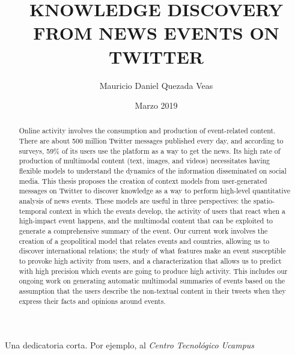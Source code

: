 \documentclass[upright, contnum]{umemoria}
\author{Mauricio Daniel Quezada Veas}
\title{KNOWLEDGE DISCOVERY FROM NEWS EVENTS ON TWITTER}
\date{Marzo 2019}
\begin{document}
\frontmatter
\maketitle 

\begin{abstract} 

    Online activity involves the consumption and production of event-related
    content. 
    There are about 500 million Twitter messages published every day, and
    according to surveys, 59\% of its users use the platform as a way to get the
    news. 
    Its high rate of production of multimodal content (text, images, and videos)
    necessitates having flexible models to understand the dynamics of
    the information disseminated on social media. 
    This thesis proposes the creation of context models from user-generated
    messages on Twitter to discover knowledge as a way to perform high-level
    quantitative analysis of news events. 
    These models are useful in three perspectives: the
    spatio-temporal context in which the events develop, the activity of users
    that react when a high-impact event happens, and the multimodal content that
    can be exploited to generate a comprehensive summary of the event. 
    Our current work involves the creation of a geopolitical model that relates
    events and countries, allowing us to discover international relations; 
    the study of what features make an event susceptible to provoke high
    activity from users, and a characterization that allows us to predict with
    high precision which events are going to produce high activity. 
    This includes our ongoing work on generating automatic multimodal summaries
    of events based on the assumption that the users describe the non-textual
    content in their tweets when they express their facts and opinions around
    events.
\end{abstract}

\begin{dedicatoria} %
Una dedicatoria corta. Por ejemplo, al \emph{Centro Tecnológico Ucampus}
\end{dedicatoria}

\begin{thanks} %
\lipsum[1-2]
\end{thanks}
\cleardoublepage

\tableofcontents
\listoftables %
\listoffigures %

\mainmatter









 





\listoftodos[Notes]  %
\end{document}
